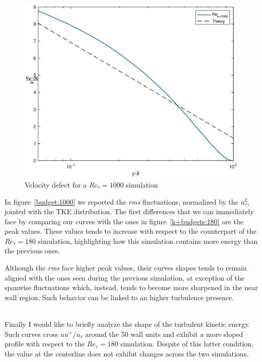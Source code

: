 \begin{figure}
\begin{center}
\includegraphics[scale=0.55]{grafici/velocity_defect_1000.eps}
\caption{Velocity defect for a $Re_{\tau}=1000$ simulation}
\label{velocity:defect:1000}
\end{center} 
\end{figure}

In figure~\ref{budget:1000} we reported the \emph{rms} fluctuations, normalized by the $u_{\tau}^{2}$, jointed with the TKE distribution. The first differences that we can immediately face by comparing our curves with the ones in figure~\ref{k+budgets:180} are the peak values. These values tends to increase with respect to the counterpart of the $Re_{\tau}=180$ simulation, highlighting how this simulation contains more energy than the previous ones.\par
Although the \emph{rms} face higher peak values, their curves shapes tends to remain aligned with the ones seen during the previous simulation, at exception of the spanwise fluctuations which, instead, tends to become more sharpened in the near wall region. Such behavior can be linked to an higher turbulence presence.\\~\par
Finally I would like to briefly analyze the shape of the turbulent kinetic energy. Such curves cross $uu^{+}/u_{\tau}$ around the 50 wall units and exhibit a more sloped profile with respect to the $Re_{\tau}=180$ simulation. Despite of this latter condition, the value at the centerline does not exhibit changes across the two simulations.\\~\par

